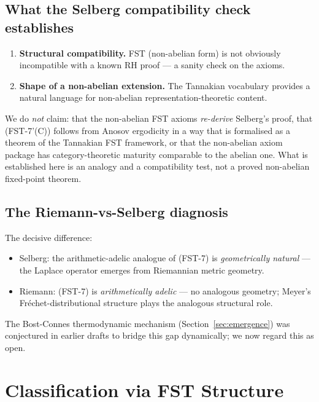 \documentclass[11pt,a4paper]{article}
\theoremstyle{plain}
\theoremstyle{definition}
\begin{document}
\subsection{What the Selberg compatibility check establishes}

\begin{enumerate}[leftmargin=*]
\item \textbf{Structural compatibility.}  FST (non-abelian form) is
  not obviously incompatible with a known RH proof --- a sanity
  check on the axioms.
\item \textbf{Shape of a non-abelian extension.}  The Tannakian
  vocabulary provides a natural language for non-abelian
  representation-theoretic content.
\end{enumerate}

We do \emph{not} claim: that the non-abelian FST axioms
\emph{re-derive} Selberg's proof, that (FST-7'(C)) follows from
Anosov ergodicity in a way that is formalised as a theorem of the
Tannakian FST framework, or that the non-abelian axiom package has
category-theoretic maturity comparable to the abelian one.  What is
established here is an analogy and a compatibility test, not a proved
non-abelian fixed-point theorem.

\subsection{The Riemann-vs-Selberg diagnosis}

The decisive difference:
\begin{itemize}
\item Selberg: the arithmetic-adelic analogue of (FST-7) is
  \emph{geometrically natural} --- the Laplace operator emerges from
  Riemannian metric geometry.
\item Riemann: (FST-7) is \emph{arithmetically adelic} --- no
  analogous geometry; Meyer's Fr\'echet-distributional structure
  plays the analogous structural role.
\end{itemize}

The Bost-Connes thermodynamic mechanism (Section~\ref{sec:emergence})
was conjectured in earlier drafts to bridge this gap dynamically;
we now regard this as open.

\section{Classification via FST Structure}
\label{sec:classification}
\end{document}
